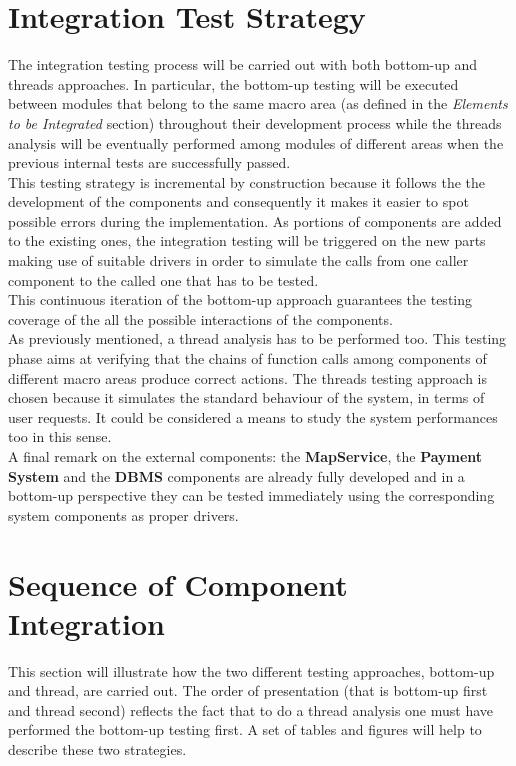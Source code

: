 \documentclass[11pt,a4paper]{report}
\begin{document}
\section{Integration Test Strategy}
The integration testing process will be carried out with both bottom-up and threads approaches. In particular, the bottom-up testing will be executed between modules that belong to the same macro area (as defined in the \textit{Elements to be Integrated} section) throughout their development process while the threads analysis will be eventually performed among modules of different areas when the previous internal tests are successfully passed.\\
This testing strategy is incremental by construction because it follows the the development of the components and consequently it makes it easier to spot possible errors during the implementation. As portions of components are added to the existing ones, the integration testing will be triggered on the new parts making use of suitable drivers in order to simulate the calls from one caller component to the called one that has to be tested.\\
This continuous iteration of the bottom-up approach guarantees the testing coverage of the all the possible interactions of the components.\\
As previously mentioned, a thread analysis has to be performed too. This testing phase aims at verifying that the chains of function calls among components of different macro areas produce correct actions. The threads testing approach is chosen because it simulates the standard behaviour of the system, in terms of user requests. It could be considered a means to study the system performances too in this sense.\\
A final remark on the external components: the \textbf{MapService}, the \textbf{Payment System} and the \textbf{DBMS} components are already fully developed and in a bottom-up perspective they can be tested immediately using the corresponding system components as proper drivers. 
\section{Sequence of Component Integration}
This section will illustrate how the two different testing approaches, bottom-up and thread, are carried out. The order of presentation (that is bottom-up first and thread second) reflects the fact that to do a thread analysis one must have performed the bottom-up testing first.
A set of tables and figures will help to describe these two strategies.
\end{document}
